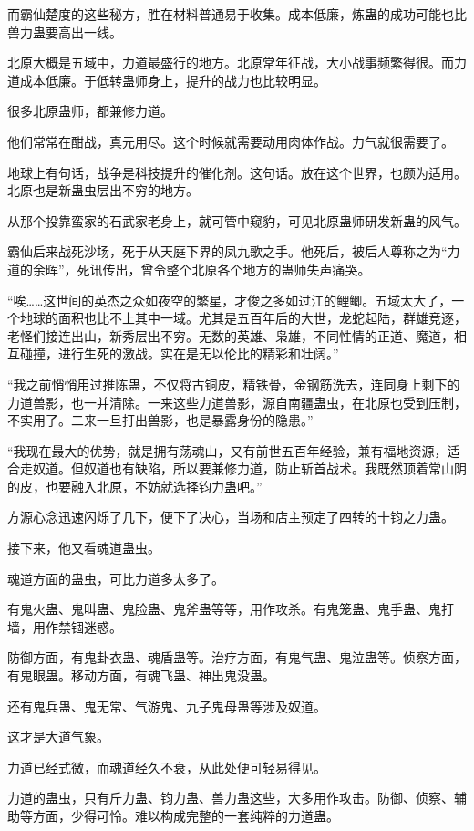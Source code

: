 \begin{this_body}
而霸仙楚度的这些秘方，胜在材料普通易于收集。成本低廉，炼蛊的成功可能也比兽力蛊要高出一线。

北原大概是五域中，力道最盛行的地方。北原常年征战，大小战事频繁得很。而力道成本低廉。于低转蛊师身上，提升的战力也比较明显。

很多北原蛊师，都兼修力道。

他们常常在酣战，真元用尽。这个时候就需要动用肉体作战。力气就很需要了。

地球上有句话，战争是科技提升的催化剂。这句话。放在这个世界，也颇为适用。北原也是新蛊虫层出不穷的地方。

从那个投靠蛮家的石武家老身上，就可管中窥豹，可见北原蛊师研发新蛊的风气。

霸仙后来战死沙场，死于从天庭下界的凤九歌之手。他死后，被后人尊称之为“力道的余晖”，死讯传出，曾令整个北原各个地方的蛊师失声痛哭。

“唉……这世间的英杰之众如夜空的繁星，才俊之多如过江的鲤鲫。五域太大了，一个地球的面积也比不上其中一域。尤其是五百年后的大世，龙蛇起陆，群雄竞逐，老怪们接连出山，新秀层出不穷。无数的英雄、枭雄，不同性情的正道、魔道，相互碰撞，进行生死的激战。实在是无以伦比的精彩和壮阔。”

“我之前悄悄用过推陈蛊，不仅将古铜皮，精铁骨，金钢筋洗去，连同身上剩下的力道兽影，也一并清除。一来这些力道兽影，源自南疆蛊虫，在北原也受到压制，不实用了。二来一旦打出兽影，也是暴露身份的隐患。”

“我现在最大的优势，就是拥有荡魂山，又有前世五百年经验，兼有福地资源，适合走奴道。但奴道也有缺陷，所以要兼修力道，防止斩首战术。我既然顶着常山阴的皮，也要融入北原，不妨就选择钧力蛊吧。”

方源心念迅速闪烁了几下，便下了决心，当场和店主预定了四转的十钧之力蛊。

接下来，他又看魂道蛊虫。

魂道方面的蛊虫，可比力道多太多了。

有鬼火蛊、鬼叫蛊、鬼脸蛊、鬼斧蛊等等，用作攻杀。有鬼笼蛊、鬼手蛊、鬼打墙，用作禁锢迷惑。

防御方面，有鬼卦衣蛊、魂盾蛊等。治疗方面，有鬼气蛊、鬼泣蛊等。侦察方面，有鬼眼蛊。移动方面，有魂飞蛊、神出鬼没蛊。

还有鬼兵蛊、鬼无常、气游鬼、九子鬼母蛊等涉及奴道。

这才是大道气象。

力道已经式微，而魂道经久不衰，从此处便可轻易得见。

力道的蛊虫，只有斤力蛊、钧力蛊、兽力蛊这些，大多用作攻击。防御、侦察、辅助等方面，少得可怜。难以构成完整的一套纯粹的力道蛊。


\end{this_body}
